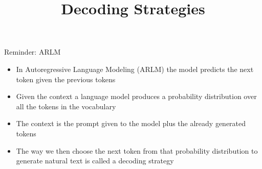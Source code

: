 



\newcommand{\learninggoals}{
\item Get to know the concept of decoding in NLP
\item Learn about different decoding strategies  
}
\def\myblue#1{\textcolor{texblue}{#1}}

\title{Decoding Strategies}
\date{}




\begin{vbframe}{Reminder: ARLM}

\vfill

\begin{itemize}
    \item In Autoregressive Language Modeling (ARLM) the model predicts the next token given the previous tokens
    \item Given the context a language model produces a probability distribution over all the tokens in the vocabulary
    \item The context is the prompt given to the model plus the already generated tokens
    \item The way we then choose the next token from that probability distribution to generate natural text is called a decoding strategy
\end{itemize}

\vfill
    
\end{vbframe}


